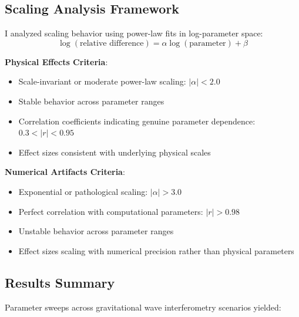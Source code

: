 \documentclass[12pt,a4paper]{article}
\begin{document}
\subsection{Scaling Analysis Framework}

I analyzed scaling behavior using power-law fits in log-parameter space:
\begin{equation}
\log(\text{relative difference}) = \alpha \log(\text{parameter}) + \beta
\end{equation}

\textbf{Physical Effects Criteria}:
\begin{itemize}
\item Scale-invariant or moderate power-law scaling: $|\alpha| < 2.0$
\item Stable behavior across parameter ranges
\item Correlation coefficients indicating genuine parameter dependence: $0.3 < |r| < 0.95$
\item Effect sizes consistent with underlying physical scales
\end{itemize}

\textbf{Numerical Artifacts Criteria}:
\begin{itemize}
\item Exponential or pathological scaling: $|\alpha| > 3.0$
\item Perfect correlation with computational parameters: $|r| > 0.98$
\item Unstable behavior across parameter ranges
\item Effect sizes scaling with numerical precision rather than physical parameters
\end{itemize}

\subsection{Results Summary}

Parameter sweeps across gravitational wave interferometry scenarios yielded:
\end{document}
